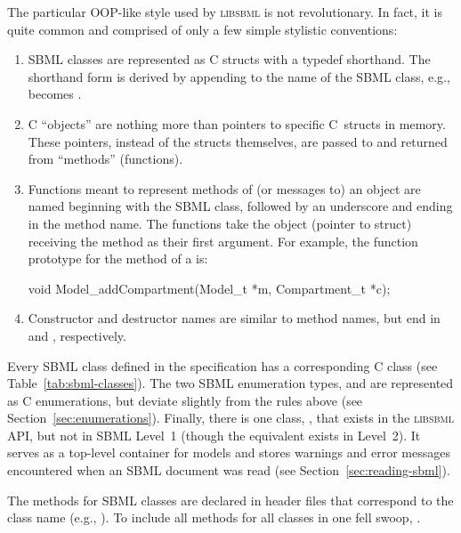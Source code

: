 \documentclass{sbmlmanual}
\newcommand{\libsbml}{\textsc{libsbml}}
\begin{document}
The particular OOP-like style used by \libsbml{} is not
revolutionary.  In fact, it is quite common and comprised of only a
few simple stylistic conventions:

\begin{enumerate}

  \item SBML classes are represented as C structs with a typedef
  shorthand.  The shorthand form is derived by appending 
  to the name of the SBML class, e.g.,  becomes
  .

  \item C ``objects'' are nothing more than pointers to specific
  C~structs in memory.  These pointers, instead of the structs
  themselves, are passed to and returned from ``methods'' (functions).

  \item Functions meant to represent methods of (or messages to) an
  object are named beginning with the SBML class, followed by an
  underscore and ending in the method name.  The functions take the
  object (pointer to struct) receiving the method as their first
  argument.  For example, the function prototype for the
   method of a  is:

    \begin{example}[c]
    void Model_addCompartment(Model_t *m, Compartment_t *c);
    \end{example}

  \item Constructor and destructor names are similar to method names,
  but end in  and , respectively.

\end{enumerate}


Every SBML class defined in the specification has a corresponding C class
(see Table~\vref{tab:sbml-classes}).  The two SBML enumeration types,
 and  are represented as C enumerations,
but deviate slightly from the rules above (see
Section~\ref{sec:enumerations}).  Finally, there is one class,
, that exists in the \libsbml{} API, but not in SBML
Level~1 (though the equivalent exists in Level~2).  It serves as a
top-level container for models and stores warnings and error messages
encountered when an SBML document was read (see
Section~\ref{sec:reading-sbml}).

The methods for SBML classes are declared in header files that correspond
to the class name (e.g., ).  To include all methods for all
classes in one fell swoop, .
\end{document}
